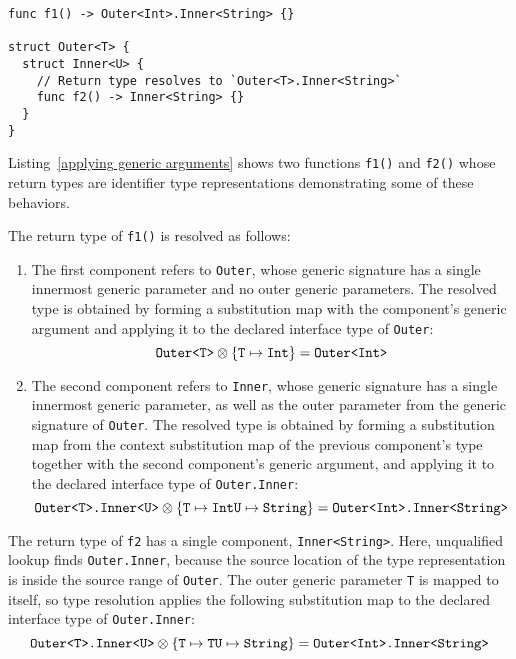\documentclass[../generics]{subfiles}
\begin{document}
\begin{listing}\label{applying generic arguments}
\begin{Verbatim}
func f1() -> Outer<Int>.Inner<String> {}

struct Outer<T> {
  struct Inner<U> {
    // Return type resolves to `Outer<T>.Inner<String>`
    func f2() -> Inner<String> {}
  }
}
\end{Verbatim}
\end{listing}
\begin{example} Listing~\ref{applying generic arguments} shows two functions \texttt{f1()} and \texttt{f2()} whose return types are identifier type representations demonstrating some of these behaviors.

The return type of \texttt{f1()} is resolved as follows:
\begin{enumerate}
\item The first component refers to \texttt{Outer}, whose generic signature has a single innermost generic parameter and no outer generic parameters. The resolved type is obtained by forming a substitution map with the component's generic argument and applying it to the declared interface type of \texttt{Outer}:
\[\texttt{Outer<T>}\otimes\{\texttt{T} \mapsto \texttt{Int}\}=\texttt{Outer<Int>}\]
\item The second component refers to \texttt{Inner}, whose generic signature has a single innermost generic parameter, as well as the outer parameter from the generic signature of \texttt{Outer}. The resolved type is obtained by forming a substitution map from the context substitution map of the previous component's type together with the second component's generic argument, and applying it to the declared interface type of \texttt{Outer.Inner}:
\[\texttt{Outer<T>.Inner<U>}\otimes\{\texttt{T} \mapsto \texttt{Int}\\
\texttt{U} \mapsto \texttt{String}\}=\texttt{Outer<Int>.Inner<String>}\]
\end{enumerate}
The return type of \texttt{f2} has a single component, \texttt{Inner<String>}. Here, unqualified lookup finds \texttt{Outer.Inner}, because the source location of the type representation is inside the source range of \texttt{Outer}. The outer generic parameter \texttt{T} is mapped to itself, so type resolution applies the following substitution map to the declared interface type of \texttt{Outer.Inner}:
\[\texttt{Outer<T>.Inner<U>}\otimes\{\texttt{T} \mapsto \texttt{T}\\
\texttt{U} \mapsto \texttt{String}\}=\texttt{Outer<Int>.Inner<String>}\]

\end{example}
\end{document}
